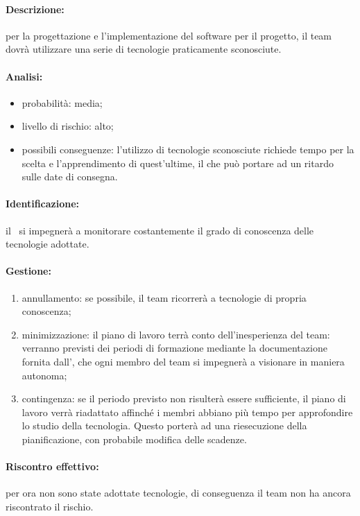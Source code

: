 \documentclass[../PianoProgetto.tex]{subfiles}
\begin{document}
	\paragraph*{Descrizione:} per la progettazione e l'implementazione del software per il progetto, il team dovrà utilizzare una serie di tecnologie praticamente sconosciute.
	
	\paragraph*{Analisi:}
	\begin{itemize}
		\item probabilità: media;
		\item livello di rischio: alto;
		\item possibili conseguenze: l'utilizzo di tecnologie sconosciute richiede tempo per la scelta e l'apprendimento di quest'ultime, il che può portare ad un ritardo sulle date di consegna.
	\end{itemize}
	
	\paragraph*{Identificazione:} il \responsabilediprogetto\ si impegnerà a monitorare costantemente il grado di conoscenza delle tecnologie adottate.
	
	\paragraph*{Gestione:}
	\begin{enumerate}
		\item annullamento: se possibile, il team ricorrerà a tecnologie di propria conoscenza;
		\item minimizzazione: il piano di lavoro terrà conto dell'inesperienza del team: verranno previsti dei periodi di formazione mediante la documentazione fornita dall'\amministratore, che ogni membro del team si impegnerà a visionare in maniera autonoma;
		\item contingenza: se il periodo previsto non risulterà essere sufficiente, il piano di lavoro verrà riadattato affinché i membri abbiano più tempo per approfondire lo studio della tecnologia. Questo porterà ad una riesecuzione della pianificazione, con probabile modifica delle scadenze.
	\end{enumerate} 
	
	\paragraph*{Riscontro effettivo:} per ora non sono state adottate tecnologie, di conseguenza il team non ha ancora riscontrato il rischio.
\end{document}
